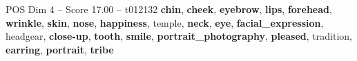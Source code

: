 \begin{textsample}{POS Dim 4 – Score 17.00 – t012132}  \label{ex:f4_pos_032}
\textbf{chin}, \textbf{cheek}, \textbf{eyebrow}, \textbf{lips}, \textbf{forehead}, \textbf{wrinkle}, \textbf{skin}, \textbf{nose}, \textbf{happiness}, temple, \textbf{neck}, \textbf{eye}, \textbf{facial\_expression}, headgear, \textbf{close-up}, \textbf{tooth}, \textbf{smile}, \textbf{portrait\_photography}, \textbf{pleased}, tradition, \textbf{earring}, \textbf{portrait}, \textbf{tribe}

\end{textsample}
